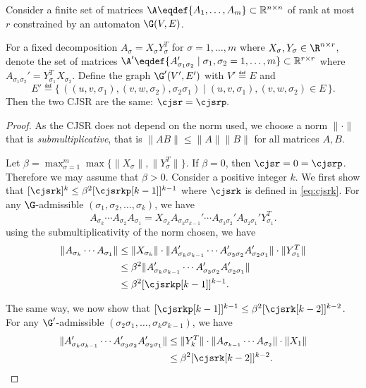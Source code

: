 \documentclass[11pt,twoside,a4paper,openright]{uclouvain-thesis}
\begin{document}
\begin{mytheo}
  \label{theo:lowrank}
  Consider a finite set of matrices $\A \eqdef \{A_1, \ldots, A_m\} \subset \mathbb{R}^{n \times n}$ of rank at most $r$
  constrained by an automaton $\G(V,E)$.

  For a fixed decomposition $A_\sigma = X_\sigma Y_\sigma^T$ for $\sigma = 1, \ldots, m$ where $X_\sigma, Y_\sigma \in \R^{n \times r}$,
  denote the set of matrices $\A' \eqdef \{A_{\sigma_1\sigma_2}' \mid \sigma_1, \sigma_2 = 1, \ldots, m\} \subset \mathbb{R}^{r \times r}$ where $A_{\sigma_1\sigma_2}' = Y_{\sigma_1}^TX_{\sigma_2}$.
  Define the graph $\G'(V',E')$ with $V' \eqdef E$ and
  \[
    E' \eqdef \{\, ((u,v,\sigma_1), (v,w,\sigma_2), \sigma_2\sigma_1) \mid (u,v,\sigma_1),(v,w,\sigma_2) \in E \,\}.
  \]
  Then the two CJSR are the same:
  \( \cjsr = \cjsrp. \)
  \begin{proof}
    As the CJSR does not depend on the norm used, we choose a norm $\|\cdot\|$ that is \emph{submultiplicative},
    that is $\|AB\| \leq \|A\| \|B\|$ for all matrices $A,B$.

    Let $\beta = \max_{\sigma=1}^m\max\{\|X_\sigma\|, \|Y_\sigma^T\|\}$.
    If $\beta = 0$, then $\cjsr = 0 = \cjsrp$.
    Therefore we may assume that $\beta > 0$.
    Consider a positive integer $k$.
    We first show that $[\cjsrk]^k \leq \beta^2[\cjsrkp[k-1]]^{k-1}$
    where $\cjsrk$ is defined in \eqref{eq:cjsrk}.
    For any $\G$-admissible $(\sigma_1, \sigma_2, \ldots, \sigma_k)$, we have
    \begin{equation*}
      \label{eq:redu}
      A_{\sigma_k} \cdots A_{\sigma_2}A_{\sigma_1} = X_{\sigma_k}A_{\sigma_k\sigma_{k-1}}' \cdots A_{\sigma_3\sigma_2}' A_{\sigma_2\sigma_1}'Y_{\sigma_1}^T.
    \end{equation*}
    using
    the submultiplicativity of the norm chosen, we have
    \begin{align*}
      \|A_{\sigma_k} \cdots A_{\sigma_1}\|
      & \leq \|X_{\sigma_k}\| \cdot \|A_{\sigma_k\sigma_{k-1}}' \cdots A_{\sigma_3\sigma_2}' A_{\sigma_2\sigma_1}'\| \cdot \|Y_{\sigma_1}^T\|\\
      & \leq \beta^2\|A_{\sigma_k\sigma_{k-1}}' \cdots A_{\sigma_3\sigma_2}' A_{\sigma_2\sigma_1}'\|\\
      & \leq \beta^2 [\cjsrkp[k-1]]^{k-1}.
    \end{align*}

    The same way, we now show that $[\cjsrkp[k-1]]^{k-1} \leq \beta^2 [\cjsrk[k-2]]^{k-2}$.
    For any $\G'$-admissible $(\sigma_2\sigma_1, \ldots, \sigma_k\sigma_{k-1})$, we have
    \begin{align*}
      \|A_{\sigma_k\sigma_{k-1}}' \cdots A_{\sigma_3\sigma_2}' A_{\sigma_2\sigma_1}'\|
      & \leq \|Y_k^T\| \cdot \|A_{\sigma_{k-1}} \cdots A_{\sigma_2}\| \cdot \|X_1\|\\
      & \leq \beta^2 [\cjsrk[k-2]]^{k-2}.
    \end{align*}


\end{proof}
\end{mytheo}
\end{document}
